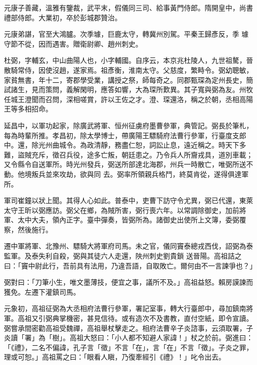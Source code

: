 \begin{pinyinscope}
 元康子善藏，溫雅有鑒裁，武平末，假儀同三司、給事黃門侍郎。隋開皇中，尚書禮部侍郎。大業初，卒於彭城郡贊治。



 元康弟諶，官至大鴻臚。次季璩，巨鹿太守，轉冀州別駕。平秦王歸彥反，季
 璩守節不從，因而遇害。贈衛尉卿、趙州刺史。



 杜弼，字輔玄，中山曲陽人也，小字輔國。自序云，本京兆杜陵人，九世祖驁，晉散騎常侍，因使沒趙，遂家焉。祖彥衡，淮南太守。父慈度，繁畤令。弼幼聰敏，家貧無書，年十二，寄郡學受業，講授之祭，師每奇之。同郡甄琛為定州長史，簡試諸生，見而策問，義解閑明，應答如響，大為琛所歎異。其子寬與弼為友。州牧任城王澄聞而召問，深相嗟賞，許以王佐之才。澄、琛還洛，稱之於朝，丞相高陽
 王等多相招命。



 延昌中，以軍功起家，除廣武將軍、恒州征虜府墨曹參軍，典管記。弼長於筆札，每為時輩所推。孝昌初，除太學博士，帶廣陽王驃騎府法曹行參軍，行臺度支郎中。還，除光州曲城令。為政清靜，務盡仁恕，詞訟止息，遠近稱之。時天下多難，盜賊充斥，徵召兵役，途多亡叛，朝廷患之。乃令兵人所齎戎具，道別車載；又令縣令自送軍所。時光州發兵，弼送所部達北海郡，州兵一時散亡，唯弼所送不動。他境叛兵並來攻劫，欲與同
 去。弼率所領親兵格鬥，終莫肯從，遂得俱達軍所。



 軍司崔鐘以狀上聞。其得人心如此。普泰中，吏曹下訪守令尤異，弼已代還，東萊太守王昕以弼應訪。弼父在鄉，為賊所害，弼行喪六年。以常調除御史，加前將軍、太中大夫，領內正字。臺中彈奏，皆弼所為。諸御史出使所上文簿，委弼覆察，然後施行。



 遷中軍將軍、北豫州、驃騎大將軍府司馬。未之官，儀同竇泰總戎西伐，詔弼為泰監軍。及泰失利自殺，弼與其徒六人走還，陜州刺史劉貴鎖
 送晉陽。高祖詰之曰：「竇中尉此行，吾前具有法用，乃違吾語，自取敗亡。爾何由不一言諫爭也？」



 弼對曰：「刀筆小生，唯文墨薄技，便宜之事，議所不及。」高祖益怒。賴房謨諫而獲免。左遷下灌鎮司馬。



 元象初，高祖征弼為大丞相府法曹行參軍，署記室事，轉大行臺郎中，尋加鎮南將軍。高祖又引弼典掌機密，甚見信待。或有造次不及書教，直付空紙，即令宣讀。弼嘗承間密勸高祖受魏禪，高祖舉杖擊走之。相府法曹辛子炎諮事，云須取署，子
 炎讀「署」為「樹」。高祖大怒曰：「小人都不知避人家諱！」杖之於前。弼進曰：「《禮》，二名不偏諱，孔子言「徵」不言「在」，言「在」不言「徵」。子炎之罪，理或可恕。」高祖罵之曰：「眼看人瞋，乃復牽經引《禮》！」叱令出去。




\end{pinyinscope}
